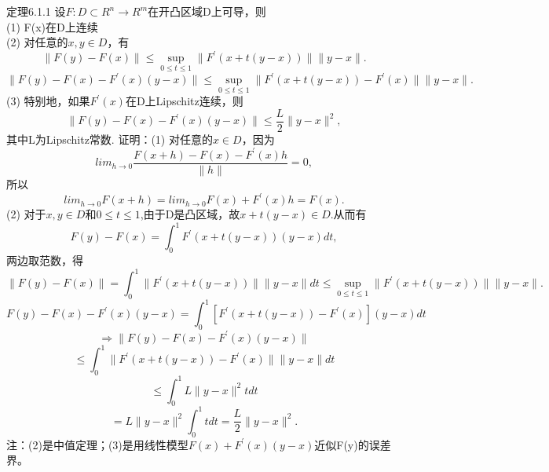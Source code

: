 \documentclass[a4paper,12pt]{article}
\begin{document}
\begin{CJK*}{UTF8}{gbsn}
	定理6.1.1 设$F:D\subset R^n \to R^m$在开凸区域D上可导，则\\
	(1) F(x)在D上连续\\
	(2) 对任意的$x,y\in D$，有
	$$\|F(y)-F(x)\|\leq \sup_{0\leq t\leq 1}\|F^{'}(x+t(y-x))\|\|y-x\|.$$
	$$\|F(y)-F(x)-F^{'}(x)(y-x)\|\leq \sup_{0\leq t\leq 1}\|F^{'}(x+t(y-x))-F^{'}(x)\|\|y-x\|.$$
	(3) 特别地，如果$F^{'}(x)$在D上Lipschitz连续，则
	$$\|F(y)-F(x)-F^{'}(x)(y-x)\|\leq \frac{L}{2}\|y-x\|^2,$$
	其中L为Lipschitz常数.
	证明：(1) 对任意的$x\in D$，因为
	$$lim_{h\to 0}\frac{F(x+h)-F(x)-F^{'}(x)h}{\|h\|}=0,$$
	所以
	$$lim_{h\to 0}F(x+h) = lim_{h\to 0}F(x) + F^{'}(x)h = F(x).$$
	(2) 对于$x,y\in D$和$0\leq t\leq 1$,由于D是凸区域，故$x+t(y-x)\in D$.从而有
	$$F(y)-F(x) = \int_0^1F^{'}(x+t(y-x))(y-x)dt,$$
	两边取范数，得
	$$\|F(y)-F(x)\| = \int_0^1\|F^{'}(x+t(y-x))\|\|y-x\|dt \leq \sup_{0\leq t\leq 1}\|F^{'}(x+t(y-x))\|\|y-x\|.$$
	$$F(y)-F(x)-F^{'}(x)(y-x)=\int_0^1[F^{'}(x+t(y-x))-F^{'}(x)](y-x)dt$$
	$$\Rightarrow \|F(y) -F(x)-F^{'}(x)(y-x)\|$$
	$$\leq \int_0^1\|F^{'}(x+t(y-x))-F^{'}(x)\|\|y-x\|dt $$
	$$\leq \int_0^1L\|y-x\|^2tdt$$
	$$ = L\|y-x\|^2\int_0^1tdt = \frac{L}{2}\|y-x\|^2.$$
	注：(2)是中值定理；(3)是用线性模型$F(x)+F^{'}(x)(y-x)$近似F(y)的误差界。

\end{CJK*}
\end{document}
